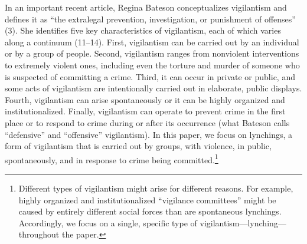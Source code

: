 \documentclass[12pt,a4paper]{article}
\begin{document}
In an important recent article, Regina Bateson \citeyearpar{bateson2020politics} conceptualizes vigilantism and defines it as ``the extralegal prevention, investigation, or punishment of offenses'' (3). She identifies five key characteristics of vigilantism, each of which varies along a continuum (11--14). First, vigilantism can be carried out by an individual or by a group of people. Second, vigilantism ranges from nonviolent interventions to extremely violent ones, including even the torture and murder of someone who is suspected of committing a crime. Third, it can occur in private or public, and some acts of vigilantism are intentionally carried out in elaborate, public displays. Fourth, vigilantism can arise spontaneously or it can be highly organized and institutionalized. Finally, vigilantism can operate to prevent crime in the first place or to respond to crime during or after its occurrence (what Bateson calls ``defensive'' and ``offensive'' vigilantism). In this paper, we focus on lynchings, a form of vigilantism that is carried out by groups, with violence, in public, spontaneously, and in response to crime being committed.\footnote{Different types of vigilantism might arise for different reasons. For example, highly organized and institutionalized ``vigilance committees'' might be caused by entirely different social forces than are spontaneous lynchings. Accordingly, we focus on a single, specific type of vigilantism---lynching---throughout the paper.}  
\end{document}
